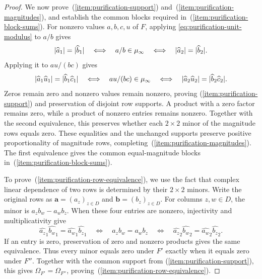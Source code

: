 \documentclass[11pt,letterpaper,onecolumn]{article}
\theoremstyle{plain}
\theoremstyle{definition}
\theoremstyle{remark}
\newcommand{\RowEq}[1]{\Omega_{#1}}
\DeclarePairedDelimiter{\abs}{\lvert}{\rvert}
\begin{document}
\begin{proof}
We now prove~(\ref{item:purification-support})
and~(\ref{item:purification-magnitudes}), and establish the common
blocks required in~(\ref{item:purification-block-sums}).
For nonzero values $a,b,c,u$ of $F$, applying
\eqref{eq:purification-unit-modulus} to $a/b$ gives
\begin{equation}
  \abs{\widehat a_1}=\abs{\widehat b_1}
  \quad\Longleftrightarrow\quad a/b\in\mu_\infty
  \quad\Longleftrightarrow\quad
  \abs{\widehat a_2}=\abs{\widehat b_2}.
  \label{eq:pure-equal-magnitude}
\end{equation}
Applying it to $au/(bc)$ gives
\begin{equation*}
  \abs{\widehat a_1\widehat u_1}=\abs{\widehat b_1\widehat c_1}
  \quad\Longleftrightarrow\quad au/(bc)\in\mu_\infty
  \quad\Longleftrightarrow\quad
  \abs{\widehat a_2\widehat u_2}=\abs{\widehat b_2\widehat c_2}.
\end{equation*}
Zeros remain zero and nonzero values remain nonzero, proving
(\ref{item:purification-support}) and preservation of disjoint row supports.
A product with a zero factor remains zero, while a product of nonzero
entries remains nonzero.  Together with the second equivalence, this
preserves whether each $2\times2$ minor of the magnitude rows equals
zero.  These equalities and the unchanged supports preserve positive
proportionality of magnitude rows, completing~(\ref{item:purification-magnitudes}).
The first equivalence gives the common equal-magnitude blocks
in~(\ref{item:purification-block-sums}).

To prove~(\ref{item:purification-row-equivalence}), we use the fact that
complex linear dependence of two rows is determined by their
$2\times2$ minors.  Write the original rows as
$\mathbf a=(a_z)_{z\in D}$ and $\mathbf b=(b_z)_{z\in D}$.
For columns $z,w\in D$, the minor is $a_zb_w-a_wb_z$.
When these four entries are nonzero, injectivity and multiplicativity give
\[
  \widehat{a_z}_{1}\widehat{b_w}_{1}
    =\widehat{a_w}_{1}\widehat{b_z}_{1}
  \quad\Longleftrightarrow\quad a_zb_w=a_wb_z
  \quad\Longleftrightarrow\quad
  \widehat{a_z}_{2}\widehat{b_w}_{2}
    =\widehat{a_w}_{2}\widehat{b_z}_{2}.
\]
If an entry is zero, preservation of zero and nonzero products gives
the same equivalence.
Thus every minor equals zero under $F'$ exactly when it equals zero
under $F''$.  Together with the common support from
(\ref{item:purification-support}), this gives
$\RowEq{F'}=\RowEq{F''}$, proving~(\ref{item:purification-row-equivalence}).


\end{proof}
\end{document}
